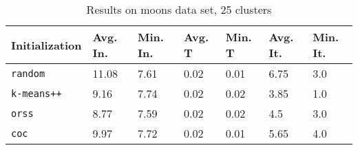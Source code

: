 \begin{table}[h]
	\begin{center}
		\begin{tabular}{|l|l|l|l|l|l|l|}
			\hline
			Initialization & Avg. In. & Min. In. & Avg. T & Min. T & Avg. It. & Min. It.\\\hline
			\texttt{random} & 11.08 & 7.61 & 0.02 & 0.01 & 6.75 & 3.0\\\hline
			\texttt{k-means++} & 9.16 & 7.74 & 0.02 & 0.02 & 3.85 & 1.0\\\hline
			\texttt{orss} & 8.77 & 7.59 & 0.02 & 0.02 & 4.5 & 3.0\\\hline
			\texttt{coc} & 9.97 & 7.72 & 0.02 & 0.01 & 5.65 & 4.0\\\hline
		\end{tabular}
		\caption{Results on moons data set, 25 clusters}
		\label{tbl:moons25}
	\end{center}
\end{table}

